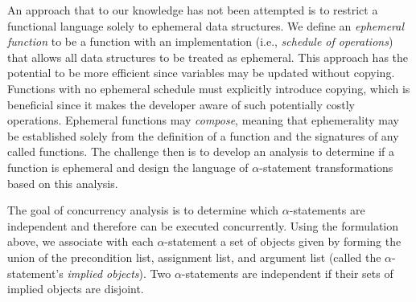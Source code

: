 An approach that to our knowledge has not been attempted is to restrict a functional language solely to ephemeral data structures.
We define an \emph{ephemeral function} to be a function with an implementation (i.e., \emph{schedule of operations}) that allows all data structures to be treated as ephemeral.
This approach has the potential to be more efficient since variables may be updated without copying.
Functions with no ephemeral schedule must explicitly introduce copying, which is beneficial since it makes the developer aware of such potentially costly operations.
Ephemeral functions may \emph{compose}, meaning that ephemerality may be established solely from the definition of a function and the signatures of any called functions.
The challenge then is to develop an analysis to determine if a function is ephemeral and design the language of $\alpha$-statement transformations based on this analysis.

The goal of concurrency analysis is to determine which $\alpha$-statements are independent and therefore can be executed concurrently.
Using the formulation above, we associate with each $\alpha$-statement a set of objects given by forming the union of the precondition list, assignment list, and argument list (called the $\alpha$-statement's \emph{implied objects}).
Two $\alpha$-statements are independent if their sets of implied objects are disjoint.



